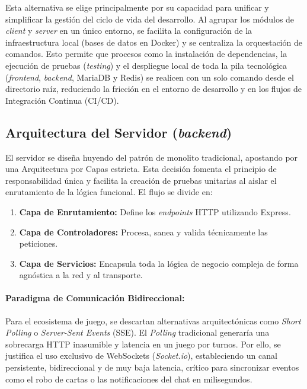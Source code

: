 Esta alternativa se elige principalmente por su capacidad para unificar y simplificar la gestión del ciclo de vida del desarrollo. Al agrupar los módulos de \textit{client} y \textit{server} en un único entorno, se facilita la configuración de la infraestructura local (bases de datos en Docker) y se centraliza la orquestación de comandos. Esto permite que procesos como la instalación de dependencias, la ejecución de pruebas (\textit{testing}) y el despliegue local de toda la pila tecnológica (\textit{frontend}, \textit{backend}, MariaDB y Redis) se realicen con un solo comando desde el directorio raíz, reduciendo la fricción en el entorno de desarrollo y en los flujos de Integración Continua (CI/CD).

\subsection{Arquitectura del Servidor (\textit{backend})}

El servidor se diseña huyendo del patrón de monolito tradicional, apostando por una Arquitectura por Capas estricta. Esta decisión fomenta el principio de responsabilidad única y facilita la creación de pruebas unitarias al aislar el enrutamiento de la lógica funcional. El flujo se divide en:

\begin{enumerate}
    \item \textbf{Capa de Enrutamiento:} Define los \textit{endpoints} HTTP utilizando Express.
    \item \textbf{Capa de Controladores:} Procesa, sanea y valida técnicamente las peticiones.
    \item \textbf{Capa de Servicios:} Encapsula toda la lógica de negocio compleja de forma agnóstica a la red y al transporte.
\end{enumerate}

\paragraph{Paradigma de Comunicación Bidireccional:}
Para el ecosistema de juego, se descartan alternativas arquitectónicas como \textit{Short Polling} o \textit{Server-Sent Events} (SSE). El \textit{Polling} tradicional generaría una sobrecarga HTTP inasumible y latencia en un juego por turnos. Por ello, se justifica el uso exclusivo de WebSockets (\textit{Socket.io}), estableciendo un canal persistente, bidireccional y de muy baja latencia, crítico para sincronizar eventos como el robo de cartas o las notificaciones del chat en milisegundos.

